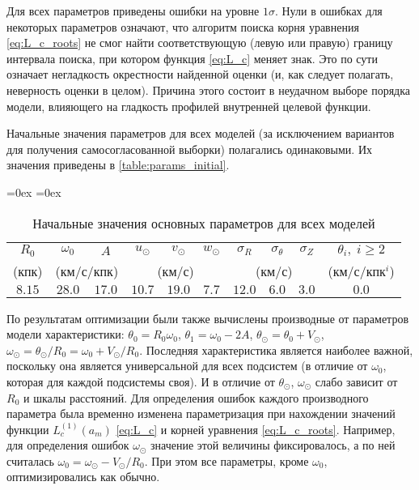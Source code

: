 \documentclass[a4paper, oneside, 14pt]{article}
\begin{document}
Для всех параметров приведены ошибки на уровне $ 1 \sigma $. Нули в ошибках для некоторых параметров означают, что алгоритм поиска корня уравнения \eqref{eq:L_c_roots} не смог найти соответствующую (левую или правую) границу интервала поиска, при котором функция \eqref{eq:L_c} меняет знак. Это по сути означает негладкость окрестности найденной оценки (и, как следует полагать, неверность оценки в целом). Причина этого состоит в неудачном выборе порядка модели, влияющего на гладкость профилей внутренней целевой функции.

Начальные значения параметров для всех моделей (за исключением вариантов для получения самосогласованной выборки) полагались одинаковыми. Их значения приведены в \autoref{table:params_initial}.

\begin{table}[H]
  \centering
  \caption{Начальные значения основных параметров для всех моделей}
  \aboverulesep=0ex
  \belowrulesep=0ex
  \renewcommand{\arraystretch}{1.25}
  \renewcommand\cellset{\renewcommand{\arraystretch}{0.7}}
  \begin{tabular}{cccccccccc}
    \toprule
    $ R_0 $ & $ \omega_0 $ & $ A $ & $ u_\odot $ & $ v_\odot $ & $ w_\odot $ & $ \sigma_R $ & $ \sigma_\theta $ & $ \sigma_Z $ & $ \theta_i, \; i \ge 2 $ \\
    (кпк) & \multicolumn{2}{c}{(км/с/кпк)} & \multicolumn{3}{c}{(км/с)} & \multicolumn{3}{c}{(км/с)} & (км/с/кпк$^i$) \\
    \midrule
    $ 8.15 $ & $ 28.0 $ & $ 17.0 $ & $ 10.7 $ & $ 19.0 $ & $ 7.7 $ & $ 12.0 $ & $ 6.0 $ & $ 3.0 $ & $ 0.0 $ \\
    \bottomrule
  \end{tabular}
  \label{table:params_initial}
\end{table}

По результатам оптимизации были также вычислены производные от параметров модели характеристики: $ \theta_0 = R_0 \omega_0 $, $ \theta_1 = \omega_0 - 2 A $, $ \theta_\odot = \theta_0 + V_\odot $, $ \omega_\odot = \theta_\odot / R_0 = \omega_0 + V_\odot / R_0 $. Последняя характеристика является наиболее важной, поскольку она является универсальной для всех подсистем (в отличие от $ \omega_0 $, которая для каждой подсистемы своя). И в отличие от $ \theta_\odot $, $ \omega_\odot $ слабо зависит от $ R_0 $ и шкалы расстояний. Для определения ошибок каждого производного параметра была временно изменена параметризация при нахождении значений функции $ L_c^{(1)}(a_m) $ \eqref{eq:L_c} и корней уравнения \eqref{eq:L_c_roots}. Например, для определения ошибок $ \omega_\odot $ значение этой величины фиксировалось, а по ней считалась $ \omega_0 = \omega_\odot - V_\odot / R_0 $. При этом все параметры, кроме $ \omega_0 $, оптимизировались как обычно.
\end{document}
